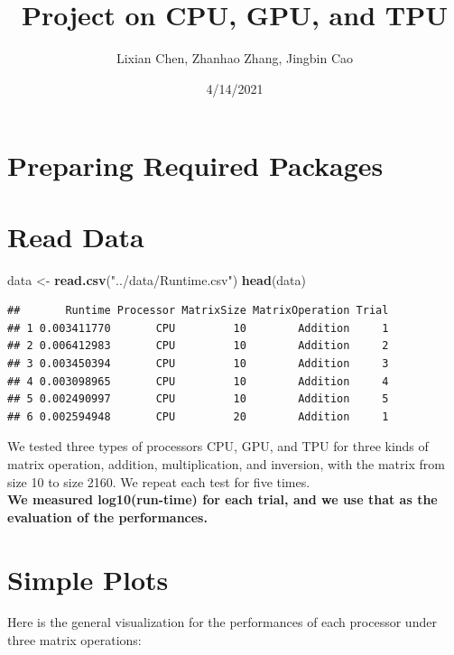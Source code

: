 \documentclass[
]{article}
\title{Project on CPU, GPU, and TPU}
\author{Lixian Chen, Zhanhao Zhang, Jingbin Cao}
\date{4/14/2021}
\newenvironment{Shaded}{\begin{snugshade}}{\end{snugshade}}
\newcommand{\KeywordTok}[1]{\textcolor[rgb]{0.13,0.29,0.53}{\textbf{#1}}}
\newcommand{\NormalTok}[1]{#1}
\newcommand{\StringTok}[1]{\textcolor[rgb]{0.31,0.60,0.02}{#1}}
\begin{document}
\maketitle

\hypertarget{preparing-required-packages}{%
\section{Preparing Required
Packages}\label{preparing-required-packages}}

\hypertarget{read-data}{%
\section{Read Data}\label{read-data}}

\begin{Shaded}
\begin{Highlighting}[]
\NormalTok{data \textless{}{-}}\StringTok{ }\KeywordTok{read.csv}\NormalTok{(}\StringTok{"../data/Runtime.csv"}\NormalTok{)}
\KeywordTok{head}\NormalTok{(data)}
\end{Highlighting}
\end{Shaded}

\begin{verbatim}
##       Runtime Processor MatrixSize MatrixOperation Trial
## 1 0.003411770       CPU         10        Addition     1
## 2 0.006412983       CPU         10        Addition     2
## 3 0.003450394       CPU         10        Addition     3
## 4 0.003098965       CPU         10        Addition     4
## 5 0.002490997       CPU         10        Addition     5
## 6 0.002594948       CPU         20        Addition     1
\end{verbatim}

We tested three types of processors CPU, GPU, and TPU for three kinds of
matrix operation, addition, multiplication, and inversion, with the
matrix from size 10 to size 2160. We repeat each test for five times.\\
\textbf{We measured log10(run-time) for each trial, and we use that as
the evaluation of the performances.}

\hypertarget{simple-plots}{%
\section{Simple Plots}\label{simple-plots}}

Here is the general visualization for the performances of each processor
under three matrix operations:
\end{document}

